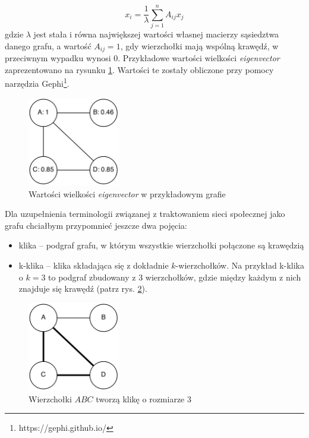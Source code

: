 \begin{equation}
x_i = \frac{1}{\lambda}\sum\limits_{j=1}^nA_{ij}x_j
\end{equation}
gdzie $\lambda$ jest stała i równa największej wartości własnej macierzy sąsiedztwa
danego grafu, a wartość $A_{ij} = 1$, gdy wierzchołki mają wspólną krawędź,
w przeciwnym wypadku wynosi $0$. Przykładowe wartości wielkości \textit{eigenvector}
zaprezentowano na rysunku \ref{image:eigenvector}. Wartości te zostały
obliczone przy pomocy narzędzia Gephi\footnote{https://gephi.github.io/}.

\begin{figure}[ht!]
\centering
\includegraphics[width=40mm]{img/eigenvector.png}
\caption{Wartości wielkości \textit{eigenvector} w przykładowym grafie}
\label{image:eigenvector}
\end{figure}

Dla uzupełnienia terminologii związanej z traktowaniem sieci społecznej
jako grafu chciałbym przypomnieć jeszcze dwa pojęcia:
\begin{itemize}
  \item klika -- podgraf grafu, w którym wszystkie wierzchołki połączone są krawędzią
  \item k-klika -- klika składająca się z dokładnie $k$-wierzchołków. Na przykład
  k-klika o $k=3$ to podgraf zbudowany z 3 wierzchołków, gdzie między każdym z 
  nich znajduje się krawędź (patrz rys. \ref{image:klika}).
\end{itemize}

\begin{figure}[ht!]
\centering
\includegraphics[width=40mm]{img/klika.png}
\caption{Wierzchołki $ABC$ tworzą klikę o rozmiarze 3}
\label{image:klika}
\end{figure}








